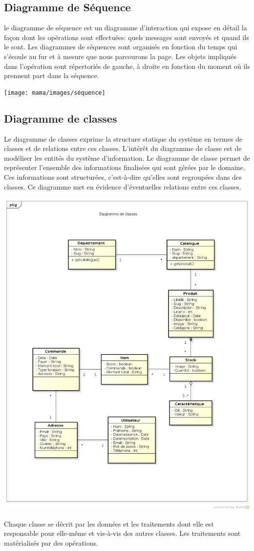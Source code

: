 \subsection{Diagramme de Séquence}

le diagramme de séquence est un diagramme d’interaction qui expose en détail
la façon dont les opérations sont effectuées: quels messages sont envoyés et quand ils le sont. Les diagrammes de séquences sont organisés en fonction du temps qui s’écoule au fur et à mesure que nous parcourons la page. Les objets impliqués dans l’opération sont répertoriés de gauche, à droite en fonction du moment où ils prennent part dans la séquence.



\begin{minipage}{0,8\textwidth}
	\texttt{[image: mama/images/séquence]}
\end{minipage}


\subsection*{Diagramme de classes}

Le diagramme de classes exprime la structure statique du système en termes de classes et de relations entre ces classes. L’intérêt du diagramme de classe est de modéliser les entités du système d’information.
Le diagramme de classe permet de représenter l’ensemble des informations finalisées qui sont gérées par le domaine. Ces informations sont structurées, c’est-à-dire qu’elles sont regroupées dans des classes. Ce
diagramme met en évidence d’éventuelles relations entre ces classes.

\begin{minipage}{1\textwidth}
	\includegraphics[width=0.7\linewidth]{mama/images/classes}
\end{minipage}


 Chaque classe se décrit par les données et les traitements dont elle est responsable pour elle-même et vis-à-vis des autres classes. Les traitements sont matérialisés par des opérations.
